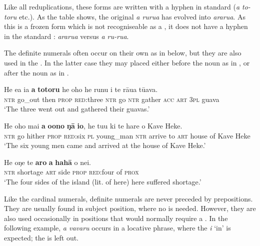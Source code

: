 
Like all reduplications, these forms are written with a hyphen in standard  (\textit{a to-toru} etc.). As the table shows, the original \textit{a rurua} has evolved into \textit{ararua}. As this is a frozen form which is not recogniseable as a , it does not have a hyphen in the standard : \textit{ararua} versus \textit{a ru-rua}.

The definite numerals often occur on their own as in  below, but they are also used in the . In the latter case they may placed either before the noun as in , or after the noun as in . 

\ea\label{ex:4.43}
\gll He e{\ꞌ}a ia \textbf{a} \textbf{totoru} he oho he runu i te rāua tūava. \\
\textsc{ntr} go\_out then \textsc{prop} \textsc{red}:three \textsc{ntr} go \textsc{ntr} gather \textsc{acc} \textsc{art} \textsc{3pl} guava \\

\glt 
‘The three went out and gathered their guavas.’ \textstyleExampleref{[R496.029]} 
\z

\ea\label{ex:4.44}
\gll He oho mai \textbf{a} \textbf{oono} \textbf{ŋā} \textbf{io}, he tu{\ꞌ}u ki te hare o Kave Heke. \\
\textsc{ntr} go hither \textsc{prop} \textsc{red}:six \textsc{pl} young\_man \textsc{ntr} arrive to \textsc{art} house of Kave Heke \\

\glt 
‘The six young men came and arrived at the house of Kave Heke.’ \textstyleExampleref{[Ley-4-01.007]}
\z

\ea\label{ex:4.45}
\gll He oŋe te \textbf{{\ꞌ}aro} \textbf{a} \textbf{hahā} o nei. \\
\textsc{ntr} shortage \textsc{art} side \textsc{prop} \textsc{red}:four of \textsc{prox} \\

\glt
‘The four sides of the island (lit. of here) here suffered shortage.’ \textstyleExampleref{[Mtx-5-02.017]}
\z

Like the cardinal numerals, definite numerals are never preceded by prepositions. They are usually found in subject position, where no  is needed. However, they are also used occasionally in positions that would normally require a . In the following example, \textit{a vavaru} occurs in a locative phrase, where the  \textit{{\ꞌ}i} ‘in’ is expected; the  is left out.

